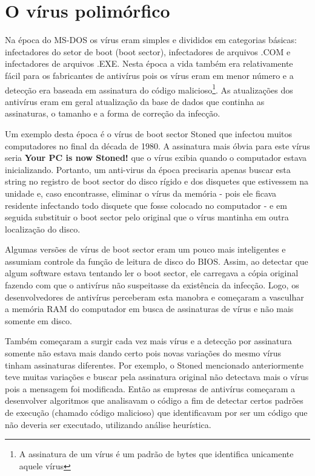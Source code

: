 \chapter{O vírus polimórfico}

Na época do MS-DOS os vírus eram simples e divididos em categorias básicas: infectadores do setor de boot (boot sector\cite{wiki:5}), infectadores de arquivos .COM e infectadores de arquivos .EXE. Nesta época a vida também era relativamente fácil para os fabricantes de antivírus pois os vírus eram em menor número e a detecção era baseada em assinatura do código malicioso\footnote{A assinatura de um vírus é um padrão de bytes que identifica unicamente aquele vírus}. As atualizações dos antivírus eram em geral atualização da base de dados que continha as assinaturas, o tamanho e a forma de correção da infecção.

Um exemplo desta época é o vírus de boot sector Stoned\cite{wiki:6} que infectou muitos computadores no final da década de 1980. A assinatura mais óbvia para este vírus seria \textbf{Your PC is now Stoned!} que o vírus exibia quando o computador estava inicializando. Portanto, um anti-virus da época precisaria apenas buscar esta string no registro de boot sector do disco rígido e dos disquetes que estivessem na unidade e, caso encontrasse, eliminar o vírus da memória - pois ele ficava residente infectando todo disquete que fosse colocado no computador - e em seguida substituir o boot sector pelo original que o vírus mantinha em outra localização do disco.

Algumas versões de vírus de boot sector eram um pouco mais inteligentes e assumiam controle da função de leitura de disco do BIOS. Assim, ao detectar que algum software estava tentando ler o boot sector, ele carregava a cópia original fazendo com que o antivírus não suspeitasse da existência da infecção. Logo, os desenvolvedores de antivírus perceberam esta manobra e começaram a vasculhar a memória RAM do computador em busca de assinaturas de vírus e não mais somente em disco.

Também começaram a surgir cada vez mais vírus e a detecção por assinatura somente não estava mais dando certo pois novas variações do mesmo vírus tinham assinaturas diferentes. Por exemplo, o Stoned mencionado anteriormente teve muitas variações e buscar pela assinatura original não detectava mais o vírus pois a mensagem foi modificada. Então as empresas de antivírus começaram a desenvolver algoritmos que analisavam o código a fim de detectar certos padrões de execução (chamado código malicioso) que identificavam por ser um código que não deveria ser executado, utilizando análise heurística\cite{wiki:7,avg:1}.

